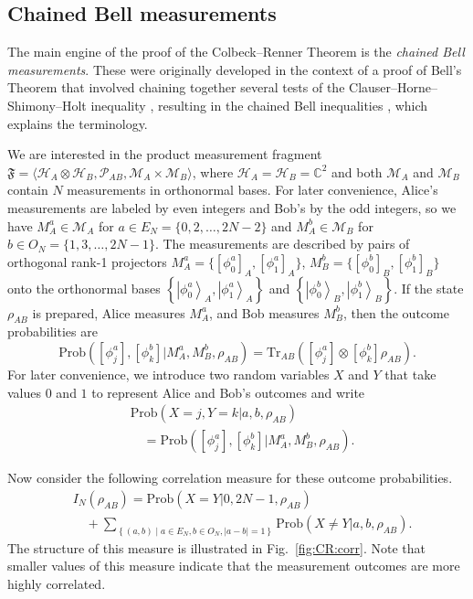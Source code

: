 \documentclass[DIV=calc,paper=a4,fontsize=11pt,twocolumn]{scrartcl} %
\theoremstyle{definition}
\theoremstyle{plain}
\newcommand{\Ket}[1]{\ensuremath{\left \vert #1 \right \rangle}}
\newcommand{\Proj}[1]{\ensuremath{\left [ #1 \right ]}}
\newcommand{\Hilb}[1][]{\ensuremath{\mathcal{H}_{#1}}}
\newcommand{\Tr}[2][]{\ensuremath{\text{Tr}_{#1} \left ( #2 \right )}}
\begin{document}
\subsection{Chained Bell measurements}

\label{CR:Chain}

The main engine of the proof of the Colbeck--Renner Theorem is the
\emph{chained Bell measurements}.  These were originally developed in
the context of a proof of Bell's Theorem that involved chaining
together several tests of the Clauser--Horne--Shimony--Holt inequality
\cite{Clauser1969}, resulting in the chained Bell inequalities
\cite{Braunstein1989, Braunstein1989a}, which explains the
terminology.

We are interested in the product measurement fragment $\mathfrak{F} =
\langle \Hilb[A] \otimes \Hilb[B], \mathcal{P}_{AB}, \mathcal{M}_A
\times \mathcal{M}_B \rangle$, where $\Hilb[A] = \Hilb[B] =
\mathbb{C}^2$ and both $\mathcal{M}_A$ and $\mathcal{M}_B$ contain $N$
measurements in orthonormal bases.  For later convenience, Alice's
measurements are labeled by even integers and Bob's by the odd
integers, so we have $M_A^a \in \mathcal{M}_A$ for $a \in E_N =
\{0,2,\ldots,2N-2\}$ and $M_A^b \in \mathcal{M}_B$ for $b \in O_N =
\{1,3,\ldots,2N-1\}$.  The measurements are described by pairs of
orthogonal rank-1 projectors $M_A^a =
\{\Proj{\phi^a_0}_A,\Proj{\phi^a_1}_A\}$, $M_B^b =
\{\Proj{\phi^b_0}_B,\Proj{\phi^b_1}_B\}$ onto the orthonormal bases
$\left \{ \Ket{\phi^a_0}_A, \Ket{\phi^a_1}_A \right \}$ and $\left \{
\Ket{\phi^b_0}_B, \Ket{\phi^b_1}_B \right \}$.  If the state
$\rho_{AB}$ is prepared, Alice measures $M_A^a$, and Bob measures
$M_B^b$, then the outcome probabilities are
\begin{equation}
\text{Prob} \left ( \Proj{\phi^a_j},
\Proj{\phi^b_k}|M_A^a,M_B^b,\rho_{AB}\right ) =
\Tr[AB]{\Proj{\phi^a_j} \otimes \Proj{\phi^b_k} \rho_{AB}}.
\end{equation}
For later convenience, we introduce two random variables $X$ and $Y$
that take values $0$ and $1$ to represent Alice and Bob's outcomes and
write
\begin{align}
&\text{Prob} (X = j,Y = k|a,b,\rho_{AB}) \nonumber\\
&\quad= \text{Prob} \left (
\Proj{\phi^a_j}, \Proj{\phi^b_k}|M_A^a,M_B^b,\rho_{AB}\right ).
\end{align}

Now consider the following correlation measure for these outcome
probabilities.
\begin{align}
\label{eq:CR:corr}
&I_N(\rho_{AB}) = \text{Prob}(X=Y|0,2N-1,\rho_{AB}) \nonumber\\
&\quad+ \sum_{\left
\{(a,b) \middle | a \in E_N, b \in O_N, |a-b| = 1 \right \}}
\text{Prob}(X \neq Y|a,b,\rho_{AB}).
\end{align}
The structure of this measure is illustrated in
Fig.~\ref{fig:CR:corr}. Note that smaller values of this measure
indicate that the measurement outcomes are more highly correlated.
\end{document}
